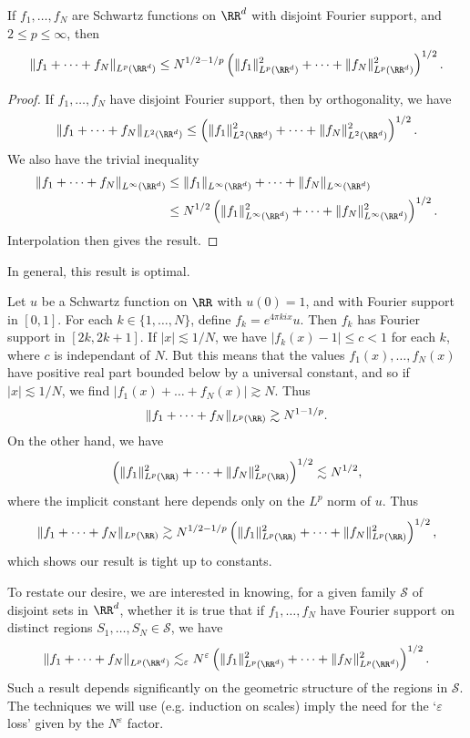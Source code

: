 \begin{theorem}
  If $f_1, \dots, f_N$ are Schwartz functions on $\RR^d$ with disjoint Fourier support, and $2 \leq p \leq \infty$, then
  \[ \| f_1 + \dots + f_N \|_{L^p(\RR^d)} \leq N^{1/2 - 1/p} \left( \| f_1 \|_{L^p(\RR^d)}^2 + \dots + \| f_N \|_{L^p(\RR^d)}^2 \right)^{1/2}. \]
\end{theorem}
\begin{proof}
  If $f_1, \dots, f_N$ have disjoint Fourier support, then by orthogonality, we have
  \[ \| f_1 + \dots + f_N \|_{L^2(\RR^d)} \leq \left( \| f_1 \|_{L^2(\RR^d)}^2 + \dots + \| f_N \|_{L^2(\RR^d)}^2 \right)^{1/2}. \]
  We also have the trivial inequality
  \begin{align*}
    \| f_1 + \dots + f_N \|_{L^\infty(\RR^d)} &\leq \| f_1 \|_{L^\infty(\RR^d)} + \dots + \| f_N \|_{L^\infty(\RR^d)}\\
    &\leq N^{1/2} \left( \| f_1 \|_{L^\infty(\RR^d)}^2 + \dots + \| f_N \|_{L^\infty(\RR^d)}^2 \right)^{1/2}.
  \end{align*}
  Interpolation then gives the result.
\end{proof}

In general, this result is optimal.

\begin{example}
  Let $u$ be a Schwartz function on $\RR$ with $u(0) = 1$, and with Fourier support in $[0,1]$. For each $k \in \{ 1, \dots, N \}$, define $f_k = e^{4 \pi k i x} u$. Then $f_k$ has Fourier support in $[2k,2k+1]$. If $|x| \lesssim 1/N$, we have $|f_k(x) - 1| \leq c < 1$ for each $k$, where $c$ is independant of $N$. But this means that the values $f_1(x), \dots, f_N(x)$ have positive real part bounded below by a universal constant, and so if $|x| \lesssim 1/N$, we find $|f_1(x) + \dots + f_N(x)| \gtrsim N$. Thus
  \[ \| f_1 + \dots + f_N \|_{L^p(\RR)} \gtrsim N^{1 - 1/p}. \]
  On the other hand, we have
  \[ \left( \| f_1 \|_{L^p(\RR)}^2 + \dots + \| f_N \|_{L^p(\RR)}^2 \right)^{1/2} \lesssim N^{1/2}, \]
  where the implicit constant here depends only on the $L^p$ norm of $u$. Thus
  \[ \| f_1 + \dots + f_N \|_{L^p(\RR)} \gtrsim N^{1/2 - 1/p} \left( \| f_1 \|_{L^p(\RR)}^2 + \dots + \| f_N \|_{L^p(\RR)}^2 \right)^{1/2}, \]
  which shows our result is tight up to constants.
\end{example}

To restate our desire, we are interested in knowing, for a given family $\mathcal{S}$ of disjoint sets in $\RR^d$, whether it is true that if $f_1, \dots, f_N$ have Fourier support on distinct regions $S_1, \dots, S_N \in \mathcal{S}$, we have
%
\[ \| f_1 + \dots + f_N \|_{L^p(\RR^d)} \lesssim_\varepsilon N^\varepsilon \left( \| f_1 \|_{L^p(\RR^d)}^2 + \dots + \| f_N \|_{L^p(\RR^d)}^2 \right)^{1/2}. \]
%
Such a result depends significantly on the geometric structure of the regions in $\mathcal{S}$. The techniques we will use (e.g. induction on scales) imply the need for the `$\varepsilon$ loss' given by the $N^\varepsilon$ factor.

